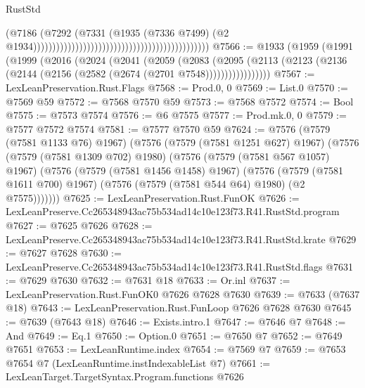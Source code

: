\begin{lexlean}{RustStd}
\begin{coremodule}
                                                                                      (@7186
                                                                                        (@7292
                                                                                          (@7331
                                                                                            (@1935
                                                                                              (@7336
                                                                                                @7499)
                                                                                              (@2
                                                                                                @1934))))))))))))))))))))))))))))))))))))))))))))))
@7566 := @1933
    (@1959
      (@1991
        (@1999
          (@2016
            (@2024
              (@2041
                (@2059
                  (@2083
                    (@2095
                      (@2113 (@2123 (@2136 (@2144 (@2156 (@2582 (@2674 (@2701 @7548)))))))))))))))))
@7567 := LexLeanPreservation.Rust.Flags
@7568 := Prod.{0, 0}
@7569 := List.{0}
@7570 := @7569 @59
@7572 := @7568 @7570 @59
@7573 := @7568 @7572
@7574 := Bool
@7575 := @7573 @7574
@7576 := @6 @7575
@7577 := Prod.mk.{0, 0}
@7579 := @7577 @7572 @7574
@7581 := @7577 @7570 @59
@7624 := @7576
    (@7579 (@7581 @1133 @76) @1967)
    (@7576
      (@7579 (@7581 @1251 @627) @1967)
      (@7576
        (@7579 (@7581 @1309 @702) @1980)
        (@7576
          (@7579 (@7581 @567 @1057) @1967)
          (@7576
            (@7579 (@7581 @1456 @1458) @1967)
            (@7576
              (@7579 (@7581 @1611 @700) @1967)
              (@7576 (@7579 (@7581 @544 @64) @1980) (@2 @7575)))))))
@7625 := LexLeanPreservation.Rust.FunOK
@7626 := LexLeanPreserve.Cc265348943ac75b534ad14c10e123f73.R41.RustStd.program
@7627 := @7625 @7626
@7628 := LexLeanPreserve.Cc265348943ac75b534ad14c10e123f73.R41.RustStd.krate
@7629 := @7627 @7628
@7630 := LexLeanPreserve.Cc265348943ac75b534ad14c10e123f73.R41.RustStd.flags
@7631 := @7629 @7630
@7632 := @7631 @18
@7633 := Or.inl
@7637 := LexLeanPreservation.Rust.FunOK0 @7626 @7628 @7630
@7639 := @7633 (@7637 @18)
@7643 := LexLeanPreservation.Rust.FunLoop @7626 @7628 @7630
@7645 := @7639 (@7643 @18)
@7646 := Exists.intro.{1}
@7647 := @7646 @7
@7648 := And
@7649 := Eq.{1}
@7650 := Option.{0}
@7651 := @7650 @7
@7652 := @7649 @7651
@7653 := LexLeanRuntime.index
@7654 := @7569 @7
@7659 := @7653 @7654 @7 (LexLeanRuntime.instIndexableList @7)
@7661 := LexLeanTarget.TargetSyntax.Program.functions @7626

\end{coremodule}
\end{lexlean}
